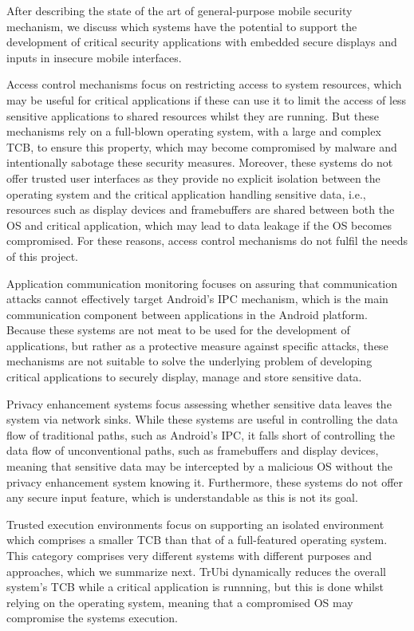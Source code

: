 After describing the state of the art of general-purpose mobile security mechanism, we discuss which systems have the potential to support the development of critical security applications with embedded secure displays and inputs in insecure mobile interfaces.

Access control mechanisms focus on restricting access to system resources, which may be useful for critical applications if these can use it to limit the access of less sensitive applications to shared resources whilst they are running. But these mechanisms rely on a full-blown operating system, with a large and complex TCB, to ensure this property, which may become compromised by malware and intentionally sabotage these security measures. Moreover, these systems do not offer trusted user interfaces as they provide no explicit isolation between the operating system and the critical application handling sensitive data, i.e., resources such as display devices and framebuffers are shared between both the OS and critical application, which may lead to data leakage if the OS becomes compromised. For these reasons, access control mechanisms do not fulfil the needs of this project.

Application communication monitoring focuses on assuring that communication attacks cannot effectively target Android's IPC mechanism, which is the main communication component between applications in the Android platform. Because these systems are not meat to be used for the development of applications, but rather as a protective measure against specific attacks, these mechanisms are not suitable to solve the underlying problem of developing critical applications to securely display, manage and store sensitive data.

Privacy enhancement systems focus assessing whether sensitive data leaves the system via network sinks. While these systems are useful in controlling the data flow of traditional paths, such as Android's IPC, it falls short of controlling the data flow of unconventional paths, such as framebuffers and display devices, meaning that sensitive data may be intercepted by a malicious OS without the privacy enhancement system knowing it. Furthermore, these systems do not offer any secure input feature, which is understandable as this is not its goal.

Trusted execution environments focus on supporting an isolated environment which comprises a smaller TCB than that of a full-featured operating system. This category comprises very different systems with different purposes and approaches, which we summarize next. TrUbi dynamically reduces the overall system's TCB while a critical application is runnning, but this is done whilst relying on the operating system, meaning that a compromised OS may compromise the systems execution.

